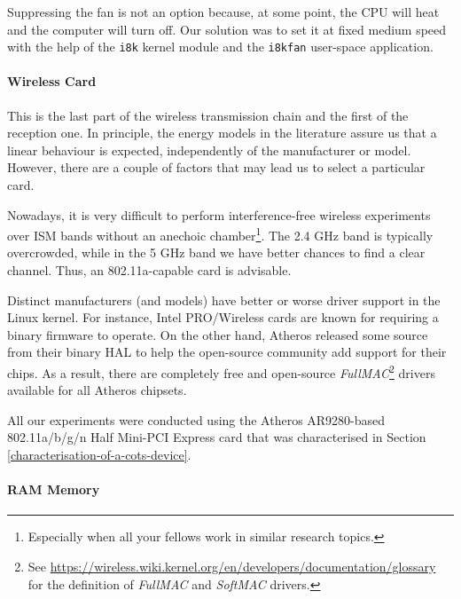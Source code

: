 \documentclass[twoside,nohyper]{tufte-book}
\providecommand{\tightlist}{%
  \setlength{\itemsep}{0pt}\setlength{\parskip}{0pt}}
\begin{document}
Suppressing the fan is not an option because, at some point, the CPU will heat and the computer will turn off. Our solution was to set it at fixed medium speed with the help of the \texttt{i8k} kernel module and the \texttt{i8kfan} user-space application.

\hypertarget{wireless-card}{%
\paragraph{Wireless Card}\label{wireless-card}}

This is the last part of the wireless transmission chain and the first of the reception one. In principle, the energy models in the literature assure us that a linear behaviour is expected, independently of the manufacturer or model. However, there are a couple of factors that may lead us to select a particular card.

\begin{description}
\tightlist
\item[Supported capabilities]
Nowadays, it is very difficult to perform interference-free wireless experiments over ISM bands without an anechoic chamber\footnote{Especially when all your fellows work in similar research topics.}. The 2.4 GHz band is typically overcrowded, while in the 5 GHz band we have better chances to find a clear channel. Thus, an 802.11a-capable card is advisable.
\item[Manufacturer]
Distinct manufacturers (and models) have better or worse driver support in the Linux kernel. For instance, Intel PRO/Wireless cards are known for requiring a binary firmware to operate. On the other hand, Atheros released some source from their binary HAL to help the open-source community add support for their chips. As a result, there are completely free and open-source \emph{FullMAC}\footnote{See \url{https://wireless.wiki.kernel.org/en/developers/documentation/glossary} for the definition of \emph{FullMAC} and \emph{SoftMAC} drivers.} drivers available for all Atheros chipsets.
\end{description}

All our experiments were conducted using the Atheros AR9280-based 802.11a/b/g/n Half Mini-PCI Express card that was characterised in Section \ref{characterisation-of-a-cots-device}.

\hypertarget{ram-memory}{%
\paragraph{RAM Memory}\label{ram-memory}}
\end{document}
